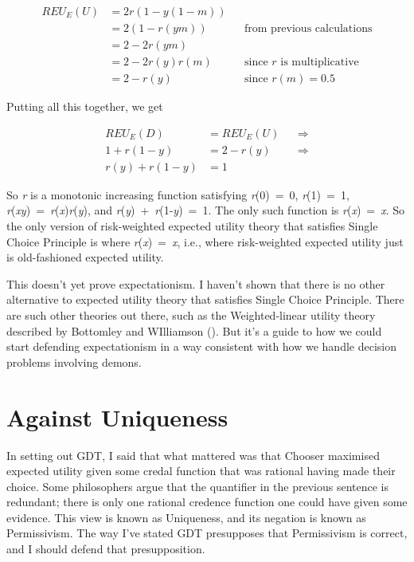 \documentclass[
  12pt,
  letterpaper,
  DIV=11,
  numbers=noendperiod]{scrreprt}
\begin{document}
\begin{align*}
REU_E(U) &= 2r(1-y(1-m)) \\
  &= 2(1-r(ym))  && \text{from previous calculations} \\
  &= 2 - 2r(ym) \\
  &= 2 - 2r(y)r(m) && \text{since $r$ is multiplicative} \\
  &= 2 - r(y)  && \text{since $r(m) = 0.5$}
\end{align*}

Putting all this together, we get

\begin{align*}
REU_E(D) &= REU_E(U)  && \Rightarrow \\
1 + r(1-y) &= 2 - r(y) && \Rightarrow \\
r(y) + r(1-y) &= 1
\end{align*}

So \emph{r} is a monotonic increasing function satisfying
\emph{r}(0)~=~0, \emph{r}(1)~=~1,
\emph{r}(\emph{xy})~=~\emph{r}(\emph{x})\emph{r}(\emph{y}), and
\emph{r}(\emph{y})~+~\emph{r}(1-\emph{y})~=~1. The only such function is
\emph{r}(\emph{x})~=~\emph{x}. So the only version of risk-weighted
expected utility theory that satisfies Single Choice Principle is where
\emph{r}(\emph{x})~=~\emph{x}, i.e., where risk-weighted expected
utility just is old-fashioned expected utility.

This doesn't yet prove expectationism. I haven't shown that there is no
other alternative to expected utility theory that satisfies Single
Choice Principle. There are such other theories out there, such as the
Weighted-linear utility theory described by Bottomley and WIlliamson
(). But it's a guide to how we
could start defending expectationism in a way consistent with how we
handle decision problems involving demons.

\chapter{Against Uniqueness}\label{sec-unique}

In setting out GDT, I said that what mattered was that Chooser maximised
expected utility given some credal function that was rational having
made their choice. Some philosophers argue that the quantifier in the
previous sentence is redundant; there is only one rational credence
function one could have given some evidence. This view is known as
Uniqueness, and its negation is known as Permissivism. The way I've
stated GDT presupposes that Permissivism is correct, and I should defend
that presupposition.
\end{document}
